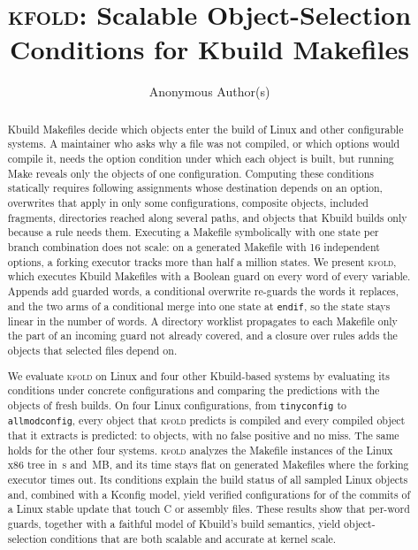 \documentclass[acmsmall,screen,review]{acmart}
\newcommand{\tool}{\textsc{kfold}\xspace}
\begin{document}
\title{\tool: Scalable Object-Selection Conditions for Kbuild Makefiles}

\author{Anonymous Author(s)}

\begin{abstract}
Kbuild Makefiles decide which objects enter the build of Linux and other configurable systems. A maintainer who asks why a file was not compiled, or which options would compile it, needs the option condition under which each object is built, but running Make reveals only the objects of one configuration. Computing these conditions statically requires following assignments whose destination depends on an option, overwrites that apply in only some configurations, composite objects, included fragments, directories reached along several paths, and objects that Kbuild builds only because a rule needs them. Executing a Makefile symbolically with one state per branch combination does not scale: on a generated Makefile with 16 independent options, a forking executor tracks more than half a million states. We present \tool, which executes Kbuild Makefiles with a Boolean guard on every word of every variable. Appends add guarded words, a conditional overwrite re-guards the words it replaces, and the two arms of a conditional merge into one state at \texttt{endif}, so the state stays linear in the number of words. A directory worklist propagates to each Makefile only the part of an incoming guard not already covered, and a closure over rules adds the objects that selected files depend on.

We evaluate \tool on Linux \NLinuxVersion and four other Kbuild-based systems by evaluating its conditions under concrete configurations and comparing the predictions with the objects of fresh builds. On four Linux configurations, from \texttt{tinyconfig} to \texttt{allmodconfig}, every object that \tool predicts is compiled and every compiled object that it extracts is predicted: \NLinuxTinyconfigTp to \NLinuxAllmodconfigTp objects, with no false positive and no miss. The same holds for the other four systems. \tool analyzes the \NLinuxInstances Makefile instances of the Linux x86 tree in \NLinuxSeconds\,s and \NLinuxRss\,MB, and its time stays flat on generated Makefiles where the forking executor times out. Its conditions explain the build status of all \NWhyCases sampled Linux objects and, combined with a Kconfig model, yield verified configurations for \NConfigforSelectable of the \NConfigforCommits commits of a Linux stable update that touch C or assembly files. These results show that per-word guards, together with a faithful model of Kbuild's build semantics, yield object-selection conditions that are both scalable and accurate at kernel scale.
\end{abstract}
\end{document}

